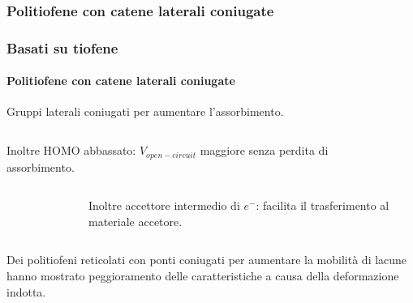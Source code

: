 \subsubsection{Politiofene con catene laterali coniugate}\begin{frame}\frametitle{Basati su tiofene}\framesubtitle{Politiofene con catene laterali coniugate}
Gruppi laterali coniugati per aumentare l'assorbimento.
\begin{columns}Inoltre HOMO abbassato: $V_{open-circuit}$ maggiore senza perdita di assorbimento.
\vspace{-20pt}\begin{figure}{}\end{figure}
\end{columns}\vspace{-20pt}
\begin{columns}\begin{figure}{}\end{figure}
Inoltre accettore intermedio di $e^-$: facilita il trasferimento al materiale accetore.
\end{columns}\vspace{5pt}
Dei politiofeni reticolati con ponti coniugati per aumentare la mobilità di lacune hanno mostrato peggioramento delle caratteristiche a causa della deformazione indotta.
\end{frame}




